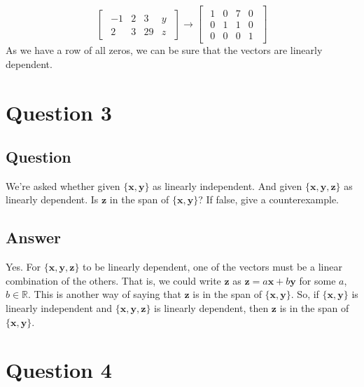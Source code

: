 \documentclass{article}
\begin{document}
\begin{description}
\[\begin{bmatrix}
\begin{array}{ccc|c}
                        -1 & 2  & 3 & y \\
                        2  & 3  & 29 & z
                    \end{array}
                    \end{bmatrix}
                    \rightarrow
                    \begin{bmatrix}
                    \begin{array}{ccc|c}
                        1 & 0 & 7 & 0 \\
                        0 & 1 & 1 & 0 \\
                        0 & 0 & 0 & 1
                    \end{array}
                    \end{bmatrix}
                    \]
                    As we have a row of all zeros, we can be sure that the vectors are linearly dependent.

            \end{description}
    \section{Question 3}
        \subsection{Question}
            We're asked whether given $\{\mathbf{x}, \mathbf{y}\}$ as linearly independent.
            And given $\{\mathbf{x}, \mathbf{y}, \mathbf{z}\}$ as linearly dependent.
            Is $\mathbf{z}$ in the span of $\{\mathbf{x}, \mathbf{y}\}$?
            If false, give a counterexample.
        \subsection{Answer}
            Yes. For $\{\mathbf{x}, \mathbf{y}, \mathbf{z}\}$ to be linearly dependent,
            one of the vectors must be a linear combination of the others.
            That is, we could write $\mathbf{z}$ as $\mathbf{z} = a\mathbf{x} + b\mathbf{y}$
            for some $a$, $b \in \mathbb{R}$.
            This is another way of saying that $\mathbf{z}$ is in the span of $\{\mathbf{x}, \mathbf{y}\}$.
            So, if $\{\mathbf{x}, \mathbf{y}\}$ is linearly independent
            and $\{\mathbf{x}, \mathbf{y}, \mathbf{z}\}$ is linearly dependent,
            then $\mathbf{z}$ is in the span of $\{\mathbf{x}, \mathbf{y}\}$.
    \section{Question 4}
\end{document}
